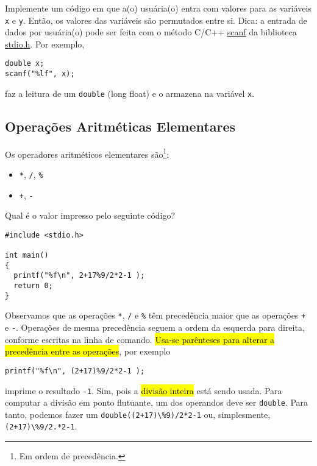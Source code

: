 \documentclass[12pt]{article}
\begin{document}
\begin{exr}
  Implemente um código em que a(o) usuária(o) entra com valores para as variáveis \lstinline+x+ e \lstinline+y+. Então, os valores das variáveis são permutados entre si. Dica: a entrada de dados por usuária(o) pode ser feita com o método C/C++ \href{https://cplusplus.com/reference/cstdio/scanf}{scanf} da biblioteca \href{https://cplusplus.com/reference/cstdio}{stdio.h}. Por exemplo,
\begin{lstlisting}
double x;
scanf("%lf", x);
\end{lstlisting}
faz a leitura de um \lstinline+double+ (long float) e o armazena na variável \lstinline+x+.
\end{exr}

\subsection{Operações Aritméticas Elementares}

Os operadores aritméticos elementares são\footnote{Em ordem de precedência.}:
\begin{itemize}
\item[] {\lstinline!*!}, {\lstinline!/!}, {\texttt{\%}} 
\item[] {\lstinline!+!}, {\lstinline!-!} 
\end{itemize}

\begin{ex}
  Qual é o valor impresso pelo seguinte código?
\begin{lstlisting}
#include <stdio.h>

int main()
{
  printf("%f\n", 2+17%9/2*2-1 );
  return 0;
}
\end{lstlisting}

  Observamos que as operações {\lstinline+*+}, {\lstinline+/+} e {\texttt{\%}} têm precedência maior que as operações {\lstinline!+!} e {\lstinline!-!}. Operações de mesma precedência seguem a ordem da esquerda para direita, conforme escritas na linha de comando. \hl{Usa-se parênteses para alterar a precedência entre as operações}, por exemplo
\begin{lstlisting}
printf("%f\n", (2+17)%9/2*2-1 );
\end{lstlisting}
imprime o resultado \lstinline!-1!. Sim, pois a \hl{divisão inteira} está sendo usada. Para computar a divisão em ponto flutuante, um dos operandos deve ser \lstinline!double!. Para tanto, podemos fazer um  \lstinline!double((2+17)\%9)/2*2-1! ou, simplesmente, \lstinline!(2+17)\%9/2.*2-1!.
\end{ex}
\end{document}
